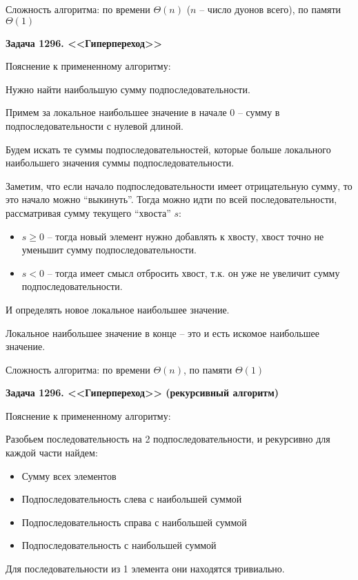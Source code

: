 \documentclass[12pt]{article}
\begin{document}
    Сложность алгоритма: по времени $\Theta(n)$ ($n$ -- число дуонов всего), по памяти $\Theta(1)$

    \bigskip
    \textbf{Задача 1296. <<Гиперпереход>>}

    Пояснение к примененному алгоритму:

    Нужно найти наибольшую сумму подпоследовательности.

    Примем за локальное наибольшее значение в начале 0 -- сумму в подпоследовательности с нулевой длиной.

    Будем искать те суммы подпоследовательностей, которые больше локального наибольшего значения суммы подпоследовательности.

    Заметим, что если начало подпоследовательности имеет отрицательную сумму, то это начало можно ``выкинуть''.
    Тогда можно идти по всей последовательности, рассматривая сумму текущего ``хвоста'' $s$:
    \begin{itemize}
        \item $s\geq 0$ -- тогда новый элемент нужно добавлять к хвосту, хвост точно не уменьшит сумму подпоследовательности.
        \item $s<0$ -- тогда имеет смысл отбросить хвост, т.к. он уже не увеличит сумму подпоследовательности.
    \end{itemize}
    И определять новое локальное наибольшее значение.

    Локальное наибольшее значение в конце -- это и есть искомое наибольшее значение.

    Сложность алгоритма: по времени $\Theta(n)$, по памяти $\Theta(1)$

    \bigskip
    \textbf{Задача 1296. <<Гиперпереход>> (рекурсивный алгоритм)}

    Пояснение к примененному алгоритму:

    Разобьем последовательность на 2 подпоследовательности, и рекурсивно для каждой части найдем:
    \begin{itemize}
        \item Сумму всех элементов
        \item Подпоследовательность слева с наибольшей суммой
        \item Подпоследовательность справа с наибольшей суммой
        \item Подпоследовательность с наибольшей суммой
    \end{itemize}

    Для последовательности из 1 элемента они находятся тривиально.
\end{document}
